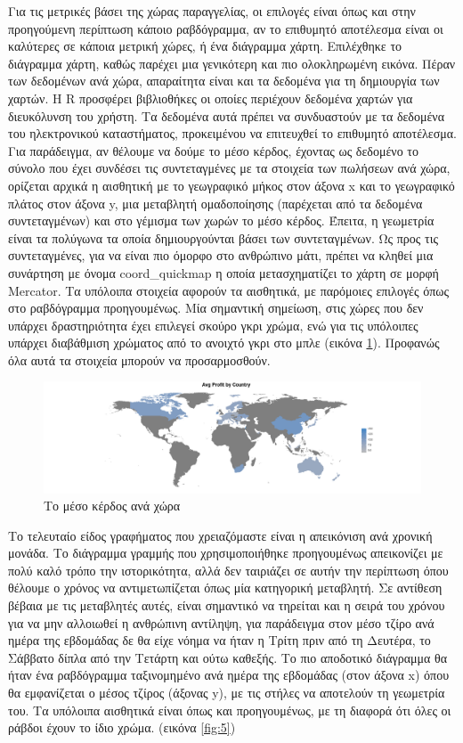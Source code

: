 \documentclass{article}
\begin{document}
Για τις μετρικές βάσει της χώρας παραγγελίας, οι επιλογές είναι όπως και στην προηγούμενη περίπτωση κάποιο ραβδόγραμμα, αν το επιθυμητό αποτέλεσμα είναι οι καλύτερες σε κάποια μετρική χώρες, ή ένα διάγραμμα χάρτη. Επιλέχθηκε το διάγραμμα χάρτη, καθώς παρέχει μια γενικότερη και πιο ολοκληρωμένη εικόνα. Πέραν των δεδομένων ανά χώρα, απαραίτητα είναι και τα δεδομένα για τη δημιουργία των χαρτών. Η R προσφέρει βιβλιοθήκες οι οποίες περιέχουν δεδομένα χαρτών για διευκόλυνση του χρήστη. Τα δεδομένα αυτά πρέπει να συνδυαστούν με τα δεδομένα του ηλεκτρονικού καταστήματος, προκειμένου να επιτευχθεί το επιθυμητό αποτέλεσμα. Για παράδειγμα, αν θέλουμε να δούμε το μέσο κέρδος, έχοντας ως δεδομένο το σύνολο που έχει συνδέσει τις συντεταγμένες με τα στοιχεία των πωλήσεων ανά χώρα, ορίζεται αρχικά η αισθητική με το γεωγραφικό μήκος στον άξονα x και το γεωγραφικό πλάτος στον άξονα y, μια μεταβλητή ομαδοποίησης (παρέχεται από τα δεδομένα συντεταγμένων) και στο γέμισμα των χωρών το μέσο κέρδος. Έπειτα, η γεωμετρία είναι τα πολύγωνα τα οποία δημιουργούνται βάσει των συντεταγμένων. Ως προς τις συντεταγμένες, για να είναι πιο όμορφο στο ανθρώπινο μάτι, πρέπει να κληθεί μια συνάρτηση με όνομα coord\_quickmap η οποία μετασχηματίζει το χάρτη σε μορφή Mercator. Τα υπόλοιπα στοιχεία αφορούν τα αισθητικά, με παρόμοιες επιλογές όπως στο ραβδόγραμμα προηγουμένως. Μία σημαντική σημείωση, στις χώρες που δεν υπάρχει δραστηριότητα έχει επιλεγεί σκούρο γκρι χρώμα, ενώ για τις υπόλοιπες υπάρχει διαβάθμιση χρώματος από το ανοιχτό γκρι στο μπλε (εικόνα \ref{fig:4}). Προφανώς όλα αυτά τα στοιχεία μπορούν να προσαρμοσθούν.

\begin{figure}[h]
    \centering
    \includegraphics[width=\textwidth]{pictures/4_map_graph.png}
    \caption{Το μέσο κέρδος ανά χώρα}
    \label{fig:4}
\end{figure}

Το τελευταίο είδος γραφήματος που χρειαζόμαστε είναι η απεικόνιση ανά χρονική μονάδα. Το διάγραμμα γραμμής που χρησιμοποιήθηκε προηγουμένως απεικονίζει με πολύ καλό τρόπο την ιστορικότητα, αλλά δεν ταιριάζει σε αυτήν την περίπτωση όπου θέλουμε ο χρόνος να αντιμετωπίζεται όπως μία κατηγορική μεταβλητή. Σε αντίθεση βέβαια με τις μεταβλητές αυτές, είναι σημαντικό να τηρείται και η σειρά του χρόνου για να μην αλλοιωθεί η ανθρώπινη αντίληψη, για παράδειγμα στον μέσο τζίρο ανά ημέρα της εβδομάδας δε θα είχε νόημα να ήταν η Τρίτη πριν από τη Δευτέρα, το Σάββατο δίπλα από την Τετάρτη και ούτω καθεξής. Το πιο αποδοτικό διάγραμμα θα ήταν ένα ραβδόγραμμα ταξινομημένο ανά ημέρα της εβδομάδας (στον άξονα x) όπου θα εμφανίζεται ο μέσος τζίρος (άξονας y), με τις στήλες να αποτελούν τη γεωμετρία του. Τα υπόλοιπα αισθητικά είναι όπως και προηγουμένως, με τη διαφορά ότι όλες οι ράβδοι έχουν το ίδιο χρώμα. (εικόνα \ref{fig:5})
\end{document}

